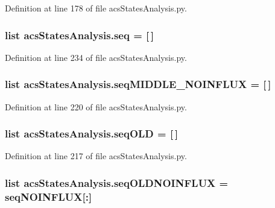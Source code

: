 Definition at line 178 of file acs\-States\-Analysis.\-py.

\hypertarget{a00104_a22eec19fcd0da474a136cfe97438ae3b}{
\subsubsection[{seq}]{\setlength{\rightskip}{0pt plus 5cm}list acs\-States\-Analysis.\-seq = \mbox{[}$\,$\mbox{]}}}\label{a00104_a22eec19fcd0da474a136cfe97438ae3b}


Definition at line 234 of file acs\-States\-Analysis.\-py.

\hypertarget{a00104_a8fd1a0445b2e641363a96da5a7e7159b}{
\subsubsection[{seq\-M\-I\-D\-D\-L\-E\-\_\-\-N\-O\-I\-N\-F\-L\-U\-X}]{\setlength{\rightskip}{0pt plus 5cm}list acs\-States\-Analysis.\-seq\-M\-I\-D\-D\-L\-E\-\_\-\-N\-O\-I\-N\-F\-L\-U\-X = \mbox{[}$\,$\mbox{]}}}\label{a00104_a8fd1a0445b2e641363a96da5a7e7159b}


Definition at line 220 of file acs\-States\-Analysis.\-py.

\hypertarget{a00104_a55e3b17fd716a4b1e28e7b9d93f1943c}{
\subsubsection[{seq\-O\-L\-D}]{\setlength{\rightskip}{0pt plus 5cm}list acs\-States\-Analysis.\-seq\-O\-L\-D = \mbox{[}$\,$\mbox{]}}}\label{a00104_a55e3b17fd716a4b1e28e7b9d93f1943c}


Definition at line 217 of file acs\-States\-Analysis.\-py.

\hypertarget{a00104_ac796dfff897c2b81d04e71e4f3306d16}{
\subsubsection[{seq\-O\-L\-D\-N\-O\-I\-N\-F\-L\-U\-X}]{\setlength{\rightskip}{0pt plus 5cm}list acs\-States\-Analysis.\-seq\-O\-L\-D\-N\-O\-I\-N\-F\-L\-U\-X = seq\-N\-O\-I\-N\-F\-L\-U\-X\mbox{[}\-:\mbox{]}}}\label{a00104_ac796dfff897c2b81d04e71e4f3306d16}


